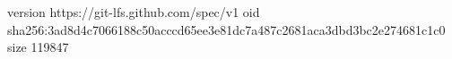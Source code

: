version https://git-lfs.github.com/spec/v1
oid sha256:3ad8d4c7066188c50acccd65ee3e81dc7a487c2681aca3dbd3bc2e274681c1c0
size 119847
